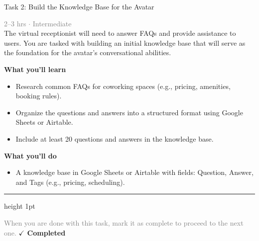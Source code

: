 \documentclass[10pt,a4paper]{article}
\begin{document}
\begin{taskbox}{Task 2: Build the Knowledge Base for the Avatar}

    {\small \textcolor{gray}{2--3 hrs $\cdot$ Intermediate}}\\[12pt]

      
The virtual receptionist will need to answer FAQs and provide assistance to users. You are tasked with building an initial knowledge base that will serve as the foundation for the avatar’s conversational abilities.


\vspace{8pt}
{\large \textbf{\textcolor{brandLight}{What you'll learn}}}\\[4pt]  
\begin{itemize}
    \item Research common FAQs for coworking spaces (e.g., pricing, amenities, booking rules).  
    \item Organize the questions and answers into a structured format using Google Sheets or Airtable.  
    \item Include at least 20 questions and answers in the knowledge base.  
\end{itemize}

\vspace{8pt}
{\large \textbf{\textcolor{brandLight}{What you'll do}}}\\[4pt]  
\begin{itemize}
    \item A knowledge base in Google Sheets or Airtable with fields: Question, Answer, and Tags (e.g., pricing, scheduling).\par
\end{itemize}

    \vspace{16pt}

    \textcolor{cardBorder}{\hrule height 1pt}\vspace{8pt}

    \small \textcolor{gray}{When you are done with this task, mark it as complete to proceed to the next one.} \hfill \textbf{\textcolor{brandDark}{$\checkmark$ Completed}}

\end{taskbox}
\end{document}
